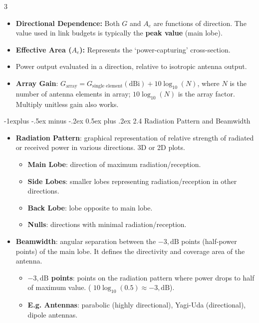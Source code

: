 \documentclass[a4paper, 9pt, landscape]{extarticle}
\makeatletter
\renewcommand{\subsection}{\@startsection{subsection}{2}{0mm}%
                                {-1explus -.5ex minus -.2ex}%
                                {0.5ex plus .2ex}%
                                {\normalfont\normalsize\bfseries}}
\makeatother
\begin{document}
\begin{multicols*}{3}
\begin{itemize}
  \item \textbf{Directional Dependence:} Both $G$ and $A_e$ are functions of direction. The value used in link budgets is typically the \textbf{peak value} (main lobe).
  \item \textbf{Effective Area ($A_e$):} Represents the `power-capturing' cross-section.
  \item Power output evaluated in a direction, relative to isotropic antenna output.
  \item \textbf{Array Gain}: $G_{\text{array}} = G_{\text{single element}}(\text{dBi}) + 10 \log_{10}(N)$, where $N$ is the number of antenna elements in array; $10 \log_{10}(N)$ is the array factor. Multiply unitless gain also works.
\end{itemize}



\subsection{2.4 Radiation Pattern and Beamwidth}
\begin{itemize}
  \item \textbf{Radiation Pattern}: graphical representation of relative strength of radiated or received power in various directions. 3D or 2D plots.
  \begin{itemize}
    \item \textbf{Main Lobe}: direction of maximum radiation/reception.
    \item \textbf{Side Lobes}: smaller lobes representing radiation/reception in other directions.
    \item \textbf{Back Lobe}: lobe opposite to main lobe.
    \item \textbf{Nulls}: directions with minimal radiation/reception.
  \end{itemize}
  \item \textbf{Beamwidth}: angular separation between the $-3,\text{dB}$ points (half-power points) of the main lobe. It defines the directivity and coverage area of the antenna.
  \begin{itemize}
    \item \textbf{$-3,\text{dB}$ points}: points on the radiation pattern where power drops to half of maximum value. ( $10\log_{10}(0.5) \approx -3,\text{dB}$).
    \item \textbf{E.g. Antennas}: parabolic (highly directional), Yagi-Uda (directional), dipole antennas.
  \end{itemize}
\end{itemize}


\end{multicols*}
\end{document}
